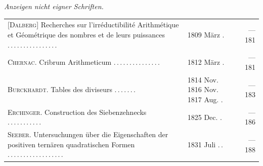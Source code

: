 \par\medskip{}\textit{Anzeigen nicht eigner Schriften.}
\begingroup\fontsize{10}{13}\selectfont
\begin{longtable}{@{}p{.60\linewidth}@{\quad}p{.24\linewidth}@{\quad}r@{}}
[\textsc{Dalberg}] Recherches sur l’irréductibilité Arithmétique et Géométrique des nombres et de leurs puissances .\,.\,.\,.\,.\,.\,.\,.\,.\,.\,.\,.\,.\,.\,.\,. & 1809 März . & — 181 \\[3pt]
\textsc{Chernac}. Cribrum Arithmeticum .\,.\,.\,.\,.\,.\,.\,.\,.\,.\,.\,.\,.\,.\,. & 1812 März . & — 181 \\[3pt]
\textsc{Burckhardt}. Tables des diviseurs .\,.\,.\,.\,.\,.\,. & 1814 Nov. 1816 Nov. 1817 Aug. . & — 183 \\[3pt]
\textsc{Erchinger}. Construction des Siebenzehnecks .\,.\,.\,.\,.\,.\,.\,.\,.\,.\,. & 1825 Dec. . & — 186 \\[3pt]
\textsc{Seeber}. Untersuchungen über die Eigenschaften der positiven ternären quadratischen Formen .\,.\,.\,.\,.\,.\,.\,.\,.\,.\,.\,.\,.\,.\,.\,.\,.\,. & 1831 Juli .\,. & — 188 \\[3pt]
\end{longtable}\endgroup
